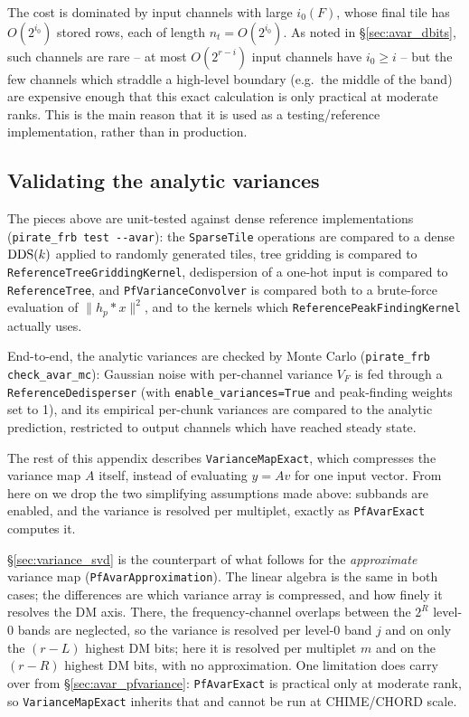 \documentclass{article}
\numberwithin{equation}{section}   %
\def\DDS{{\rm DDS}}
\begin{document}
The cost is dominated by input channels with large $i_0(F)$, whose final tile has $O(2^{i_0})$
stored rows, each of length $n_t = O(2^{i_0})$. As noted in \S\ref{sec:avar_dbits}, such channels
are rare -- at most $O(2^{r-i})$ input channels have $i_0 \ge i$ -- but the few channels which
straddle a high-level boundary (e.g.\ the middle of the band) are expensive enough that this exact
calculation is only practical at moderate ranks. This is the main reason that it is used as a
testing/reference implementation, rather than in production.

\subsection{Validating the analytic variances}
\label{sec:avar_validation}

The pieces above are unit-tested against dense reference implementations
(\verb|pirate_frb test --avar|): the \verb|SparseTile| operations are compared to a dense
$\DDS(k)$ applied to randomly generated tiles, tree gridding is compared to
\verb|ReferenceTreeGriddingKernel|, dedispersion of a one-hot input is compared to
\verb|ReferenceTree|, and \verb|PfVarianceConvolver| is compared both to a brute-force evaluation
of $\|h_p * x\|^2$, and to the kernels which \verb|ReferencePeakFindingKernel| actually uses.

End-to-end, the analytic variances are checked by Monte Carlo
(\verb|pirate_frb check_avar_mc|): Gaussian noise with per-channel variance $V_F$ is fed through a
\verb|ReferenceDedisperser| (with \verb|enable_variances=True| and peak-finding weights set to 1),
and its empirical per-chunk variances are compared to the analytic prediction, restricted to
output channels which have reached steady state.

\clearpage

The rest of this appendix describes \verb|VarianceMapExact|, which compresses the variance map
$A$ itself, instead of evaluating $y = Av$ for one input vector. From here on we drop the two
simplifying assumptions made above: subbands are enabled, and the variance is resolved per
multiplet, exactly as {\tt PfAvarExact} computes it.

\S\ref{sec:variance_svd} is the counterpart of what follows for the {\em approximate} variance
map ({\tt PfAvarApproximation}). The linear algebra is the same in both cases; the differences
are which variance array is compressed, and how finely it resolves the DM axis. There, the
frequency-channel overlaps between the $2^R$ level-0 bands are neglected, so the variance is
resolved per level-0 band $j$ and on only the $(r-L)$ highest DM bits; here it is resolved per
multiplet $m$ and on the $(r-R)$ highest DM bits, with no approximation. One limitation does
carry over from \S\ref{sec:avar_pfvariance}: {\tt PfAvarExact} is practical only at moderate
rank, so {\tt VarianceMapExact} inherits that and cannot be run at CHIME/CHORD scale.
\end{document}
